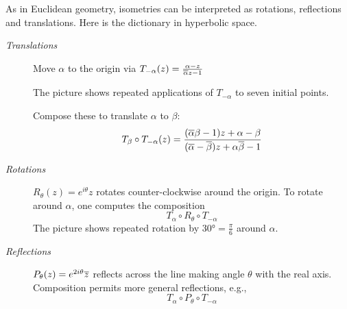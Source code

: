\label{pg:hypisomclass}

As in Euclidean geometry, isometries can be interpreted as rotations, reflections and translations. Here is the dictionary in hyperbolic space.\par

\begin{minipage}[t]{0.75\linewidth}\vspace{-3pt}
	\begin{description}
		\item[\normalfont\emph{Translations}] Move $\alpha$ to the origin via $T_{-\alpha}(z)=\frac{\alpha-z}{\overline{\alpha} z-1}$\par
		The picture shows repeated applications of $T_{-\alpha}$ to seven initial points.\par
	Compose these to translate $\alpha$ to $\beta$:
		\[
			T_{\beta}\circ T_{-\alpha}(z)=\frac{(\overline{\alpha}\beta-1)z+\alpha-\beta}{(\overline{\alpha}-\overline{\beta})z+\alpha\overline{\beta}-1}
		\]
	
		\item[\normalfont\emph{Rotations}] $R_\theta(z)=e^{i\theta}z$ rotates counter-clockwise around the origin. To rotate around $\alpha$, one computes the composition
		\[
			T_{\alpha}\circ R_\theta\circ T_{-\alpha}
		\]
		The picture shows repeated rotation by $\ang{30}=\frac\pi 6$ around $\alpha$.
	
		\item[\normalfont\emph{Reflections}] $P_\theta(z)=e^{2i\theta}\overline{z}$ reflects across the line making angle $\theta$ with the real axis. Composition permits more general reflections, e.g.,
		\[
			T_{\alpha}\circ P_\theta\circ T_{-\alpha}
		\]
	\end{description}
\end{minipage}
\hfill
